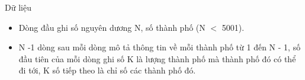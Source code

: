 Dữ liệu
\begin{itemize}
	\item     Dòng đầu ghi số nguyên dương N, số thành phố (N $<$ 5001).   
	\item     N -1 dòng sau mỗi dòng mô tả thông tin về mỗi thành phố từ 1 đến N - 1, số đầu tiên của mỗi dòng ghi số K là lượng thành phố mà thành phố đó có thể đi tới, K số tiếp theo là chỉ số các thành phố đó.   
\end{itemize}
